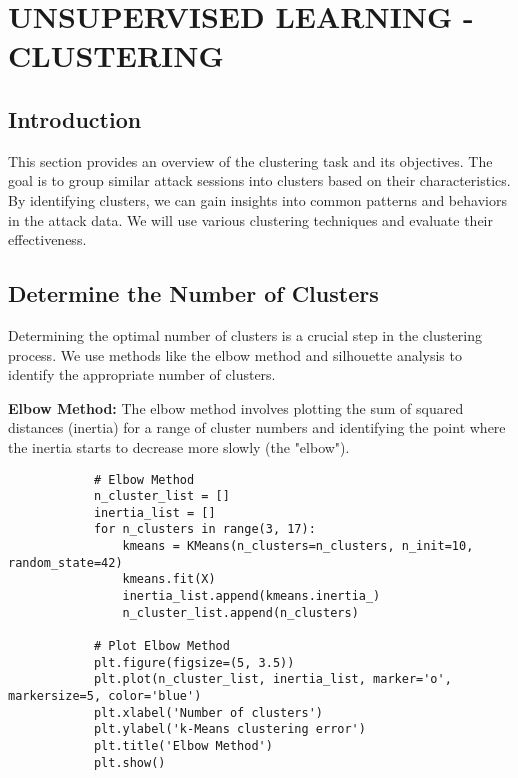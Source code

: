 

\section{UNSUPERVISED LEARNING - CLUSTERING}


    \subsection{Introduction}
    
        This section provides an overview of the clustering task and its objectives. The goal is to group similar attack sessions into clusters based on their characteristics. By identifying clusters, we can gain insights into common patterns and behaviors in the attack data. We will use various clustering techniques and evaluate their effectiveness.

    \subsection{Determine the Number of Clusters}
    
        Determining the optimal number of clusters is a crucial step in the clustering process. We use methods like the elbow method and silhouette analysis to identify the appropriate number of clusters.

        \textbf{Elbow Method:} The elbow method involves plotting the sum of squared distances (inertia) for a range of cluster numbers and identifying the point where the inertia starts to decrease more slowly (the "elbow").

        \begin{verbatim}
            # Elbow Method
            n_cluster_list = []
            inertia_list = []
            for n_clusters in range(3, 17):
                kmeans = KMeans(n_clusters=n_clusters, n_init=10, random_state=42)
                kmeans.fit(X)
                inertia_list.append(kmeans.inertia_)
                n_cluster_list.append(n_clusters)
            
            # Plot Elbow Method
            plt.figure(figsize=(5, 3.5))
            plt.plot(n_cluster_list, inertia_list, marker='o', markersize=5, color='blue')
            plt.xlabel('Number of clusters')
            plt.ylabel('k-Means clustering error')
            plt.title('Elbow Method')
            plt.show()
        \end{verbatim}


